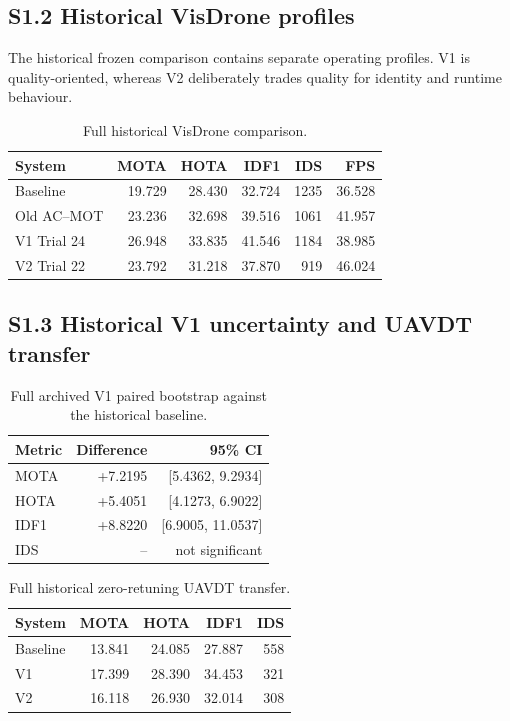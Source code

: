 \documentclass[11pt]{article}
\begin{document}
\subsection*{S1.2 Historical VisDrone profiles}
The historical frozen comparison contains separate operating profiles. V1 is
quality-oriented, whereas V2 deliberately trades quality for identity and
runtime behaviour.

\begin{table}[ht]
\centering\small
\caption{Full historical VisDrone comparison.}
\label{tab:s1-visdrone}
\begin{tabular}{lrrrrr}
\toprule
System & MOTA & HOTA & IDF1 & IDS & FPS\\
\midrule
Baseline & 19.729 & 28.430 & 32.724 & 1235 & 36.528\\
Old AC--MOT & 23.236 & 32.698 & 39.516 & 1061 & 41.957\\
V1 Trial 24 & 26.948 & 33.835 & 41.546 & 1184 & 38.985\\
V2 Trial 22 & 23.792 & 31.218 & 37.870 & 919 & 46.024\\
\bottomrule
\end{tabular}
\end{table}

\subsection*{S1.3 Historical V1 uncertainty and UAVDT transfer}

\begin{table}[ht]
\centering\small
\caption{Full archived V1 paired bootstrap against the historical baseline.}
\label{tab:s1-bootstrap}
\begin{tabular}{lrr}
\toprule
Metric & Difference & 95\% CI\\
\midrule
MOTA & +7.2195 & [5.4362, 9.2934]\\
HOTA & +5.4051 & [4.1273, 6.9022]\\
IDF1 & +8.8220 & [6.9005, 11.0537]\\
IDS & -- & not significant\\
\bottomrule
\end{tabular}
\end{table}

\begin{table}[ht]
\centering\small
\caption{Full historical zero-retuning UAVDT transfer.}
\label{tab:s1-uavdt}
\begin{tabular}{lrrrr}
\toprule
System & MOTA & HOTA & IDF1 & IDS\\
\midrule
Baseline & 13.841 & 24.085 & 27.887 & 558\\
V1 & 17.399 & 28.390 & 34.453 & 321\\
V2 & 16.118 & 26.930 & 32.014 & 308\\
\bottomrule
\end{tabular}
\end{table}
\end{document}
